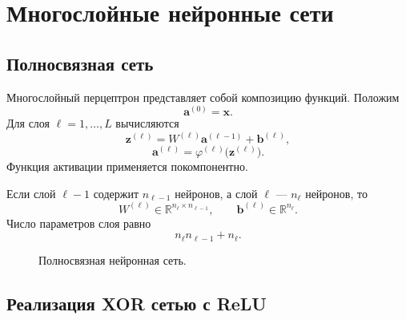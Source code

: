 \documentclass[12pt,a4paper]{article}
\theoremstyle{definition}
\newcommand{\R}{\mathbb{R}}
\newcommand{\1}{\mathbf{1}}
\begin{document}
\section{Многослойные нейронные сети}

\subsection{Полносвязная сеть}

Многослойный перцептрон представляет собой композицию функций.
Положим
\[
    \bm{a}^{(0)}=\bm{x}.
\]
Для слоя $\ell=1,\ldots,L$ вычисляются
\[
    \bm{z}^{(\ell)}
    =
    W^{(\ell)}\bm{a}^{(\ell-1)}
    +
    \bm{b}^{(\ell)},
\]
\[
    \bm{a}^{(\ell)}
    =
    \varphi^{(\ell)}\bigl(\bm{z}^{(\ell)}\bigr).
\]
Функция активации применяется покомпонентно.

Если слой $\ell-1$ содержит $n_{\ell-1}$ нейронов, а слой $\ell$ ---
$n_\ell$ нейронов, то
\[
    W^{(\ell)}
    \in
    \R^{n_\ell\times n_{\ell-1}},
    \qquad
    \bm{b}^{(\ell)}
    \in
    \R^{n_\ell}.
\]
Число параметров слоя равно
\[
    n_\ell n_{\ell-1}+n_\ell.
\]

\begin{figure}[h]
\centering
{}
\caption{Полносвязная нейронная сеть.}
\end{figure}

\subsection{Реализация XOR сетью с ReLU}
\end{document}
